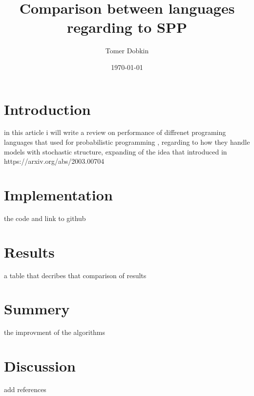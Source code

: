 \documentclass{article}
\title{Comparison between languages regarding to SPP}
\author{Tomer Dobkin}
\date{\today}
\begin{document}
\maketitle
\section{Introduction}
in this article i will write a review on performance of diffrenet programing languages that used for probabilistic programming , regarding to how they handle models with stochastic structure, expanding of the idea that introduced in https://arxiv.org/abs/2003.00704
\section{Implementation}
the code and link to github
\section{Results}
a table that decribes that comparison of results
\section{Summery}
the improvment of the algorithms
\section{Discussion}
add references
\end{document}

